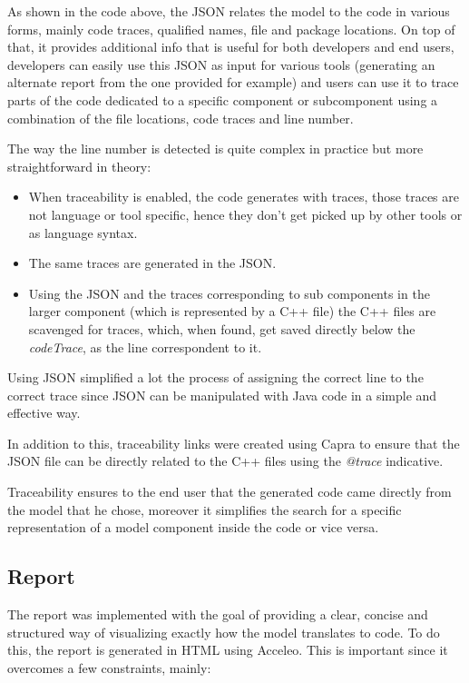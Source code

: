 As shown in the code above, the \gls{JSON} relates the model to the code in various forms, mainly code traces, qualified names, file and package locations. On top of that, it provides additional info that is useful for both developers and end users, developers can easily use this \gls{JSON} as input for various tools (generating an alternate report from the one provided for example) and users can use it to trace parts of the code dedicated to a specific component or subcomponent using a combination of the file locations, code traces and line number.

The way the line number is detected is quite complex in practice but more straightforward in theory:

\begin{itemize} 
	\item When traceability is enabled, the code generates with traces, those traces are not language or tool specific, hence they don't get picked up by other tools or as language syntax.
	\item The same traces are generated in the \gls{JSON}.
	\item Using the \gls{JSON} and the traces corresponding to sub components in the larger component (which is represented by a C++ file) the C++ files are scavenged for traces, which, when found, get saved directly below the \textit{codeTrace}, as the line correspondent to it.
\end{itemize}

Using \gls{JSON} simplified a lot the process of assigning the correct line to the correct trace since \gls{JSON} can be manipulated with Java code in a simple and effective way.

In addition to this, traceability links were created using Capra to ensure that the \gls{JSON} file can be directly related to the C++ files using the \textit{@trace} indicative.

Traceability ensures to the end user that the generated code came directly from the model that he chose, moreover it simplifies the search for a specific representation of a model component inside the code or vice versa.

\subsection{Report}
\label{sec:impl_report}

The report was implemented with the goal of providing a clear, concise and structured way of visualizing exactly how the model translates to code. To do this, the report is generated in \gls{HTML} using Acceleo. This is important since it overcomes a few constraints, mainly:

